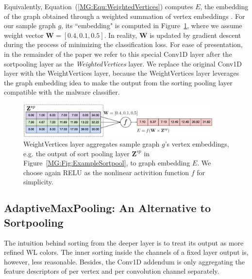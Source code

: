 Equivalently, Equation~(\ref{MG:Equ:WeightedVertices}) computes $E$, the embedding of the graph obtained through a weighted summation of vertex embeddings \cite{GraphEmbedding}.
For our sample graph $g$, its ``embedding" is computed in Figure~\ref{MG:Fig:ExampleWeightedVertice}, where we assume weight vector $\mathbf{W}=[0.4, 0.1, 0.5]$.
In reality, $\mathbf{W}$ is updated by gradient descent during the process of minimizing the classification loss.
For ease of presentation, in the remainder of the paper we refer to this special Conv1D layer after the sortpooling layer as the \textit{WeightedVertices} layer.
We replace the original Conv1D layer with the WeightVertices layer, because the WeightVertices layer leverages the graph embedding idea to make the output from the sorting pooling layer compatible with the malware classifier.


\begin{figure}[htbp]
\centerline{\includegraphics[width=0.92\textwidth]{Magic/figures/ExampleWeightedVertice.eps}}
\caption{WeightVertices layer aggregates sample graph $g$'s vertex embeddings,
e.g. the output of sort pooling layer $\mathbf{Z}^{sp}$ in Figure~\ref{MG:Fig:ExampleSortpool}, to graph embedding $E$. We choose again RELU as the nonlinear activition function $f$ for simplicity.}
\label{MG:Fig:ExampleWeightedVertice}
\end{figure}

\subsection{AdaptiveMaxPooling: An Alternative to Sortpooling}
The intuition behind sorting from the deeper layer is to treat its output as more refined WL colors\cite{WlAlgorithm, WlGraphKernel}.
The inner sorting inside the channels of a fixed layer output is, however, less reasonable.
Besides, the Conv1D addendum is only aggregating the feature descriptors of per vertex and per convolution channel separately.

